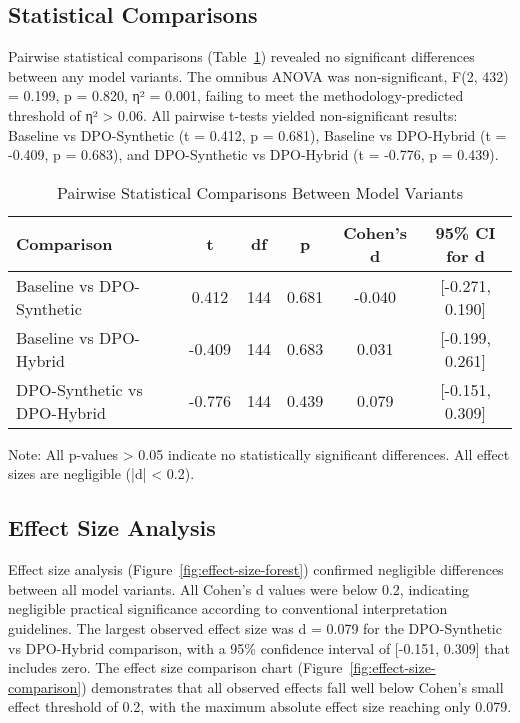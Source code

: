 \subsection{Statistical Comparisons}

Pairwise statistical comparisons (Table~\ref{tab:statistical-comparisons}) revealed no significant differences between any model variants. The omnibus ANOVA was non-significant, F(2, 432) = 0.199, p = 0.820, η² = 0.001, failing to meet the methodology-predicted threshold of η² > 0.06. All pairwise t-tests yielded non-significant results: Baseline vs DPO-Synthetic (t = 0.412, p = 0.681), Baseline vs DPO-Hybrid (t = -0.409, p = 0.683), and DPO-Synthetic vs DPO-Hybrid (t = -0.776, p = 0.439).

\begin{table}[htbp]
\centering
\caption{Pairwise Statistical Comparisons Between Model Variants}
\label{tab:statistical-comparisons}
\begin{tabular}{lccccc}
\toprule
\textbf{Comparison} & \textbf{t} & \textbf{df} & \textbf{p} & \textbf{Cohen's d} & \textbf{95\% CI for d} \\
\midrule
Baseline vs DPO-Synthetic    & 0.412 & 144 & 0.681 & -0.040 & [-0.271, 0.190] \\
Baseline vs DPO-Hybrid       & -0.409 & 144 & 0.683 & 0.031 & [-0.199, 0.261] \\
DPO-Synthetic vs DPO-Hybrid  & -0.776 & 144 & 0.439 & 0.079 & [-0.151, 0.309] \\
\bottomrule
\end{tabular}
\begin{tablenotes}
\small
\item Note: All p-values > 0.05 indicate no statistically significant differences. All effect sizes are negligible (|d| < 0.2).
\end{tablenotes}
\end{table}

\subsection{Effect Size Analysis}

Effect size analysis (Figure~\ref{fig:effect-size-forest}) confirmed negligible differences between all model variants. All Cohen's d values were below 0.2, indicating negligible practical significance according to conventional interpretation guidelines. The largest observed effect size was d = 0.079 for the DPO-Synthetic vs DPO-Hybrid comparison, with a 95\% confidence interval of [-0.151, 0.309] that includes zero. The effect size comparison chart (Figure~\ref{fig:effect-size-comparison}) demonstrates that all observed effects fall well below Cohen's small effect threshold of 0.2, with the maximum absolute effect size reaching only 0.079.

